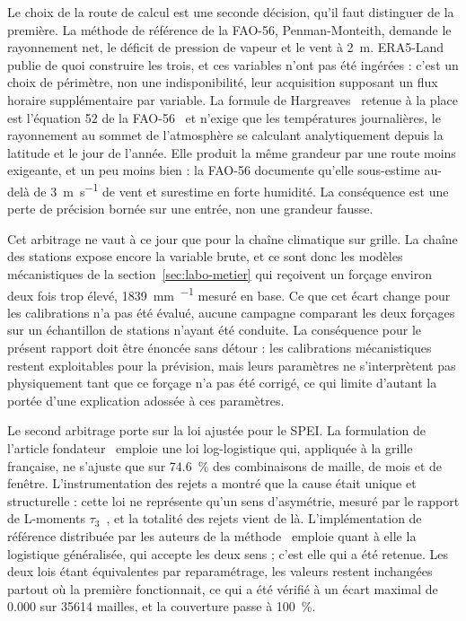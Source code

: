 Le choix de la route de calcul est une seconde décision, qu'il faut distinguer de la première. La méthode de référence de la FAO-56, Penman-Monteith, demande le rayonnement net, le déficit de pression de vapeur et le vent à \SI{2}{\metre}. ERA5-Land publie de quoi construire les trois, et ces variables n'ont pas été ingérées : c'est un choix de périmètre, non une indisponibilité, leur acquisition supposant un flux horaire supplémentaire par variable. La formule de Hargreaves~\cite{hargreaves1985} retenue à la place est l'équation 52 de la FAO-56~\cite{allen1998fao56} et n'exige que les températures journalières, le rayonnement au sommet de l'atmosphère se calculant analytiquement depuis la latitude et le jour de l'année. Elle produit la même grandeur par une route moins exigeante, et un peu moins bien : la FAO-56 documente qu'elle sous-estime au-delà de \SI{3}{\metre\per\second} de vent et surestime en forte humidité. La conséquence est une perte de précision bornée sur une entrée, non une grandeur fausse.

Cet arbitrage ne vaut à ce jour que pour la chaîne climatique sur grille. La chaîne des stations expose encore la variable brute, et ce sont donc les modèles mécanistiques de la section~\ref{sec:labo-metier} qui reçoivent un forçage environ deux fois trop élevé, \SI{1839}{\milli\metre\per\an} mesuré en base. Ce que cet écart change pour les calibrations n'a pas été évalué, aucune campagne comparant les deux forçages sur un échantillon de stations n'ayant été conduite. La conséquence pour le présent rapport doit être énoncée sans détour : les calibrations mécanistiques restent exploitables pour la prévision, mais leurs paramètres ne s'interprètent pas physiquement tant que ce forçage n'a pas été corrigé, ce qui limite d'autant la portée d'une explication adossée à ces paramètres.

Le second arbitrage porte sur la loi ajustée pour le SPEI. La formulation de l'article fondateur~\cite{vicenteserrano2010spei} emploie une loi log-logistique qui, appliquée à la grille française, ne s'ajuste que sur \SI{74,6}{\percent} des combinaisons de maille, de mois et de fenêtre. L'instrumentation des rejets a montré que la cause était unique et structurelle : cette loi ne représente qu'un sens d'asymétrie, mesuré par le rapport de L-moments $\tau_3$~\cite{hosking1990lmoments}, et la totalité des rejets vient de là. L'implémentation de référence distribuée par les auteurs de la méthode~\cite{begueria_spei_package} emploie quant à elle la logistique généralisée, qui accepte les deux sens ; c'est elle qui a été retenue. Les deux lois étant équivalentes par reparamétrage, les valeurs restent inchangées partout où la première fonctionnait, ce qui a été vérifié à un écart maximal de \num{0,000} sur \num{35614} mailles, et la couverture passe à \SI{100}{\percent}.

